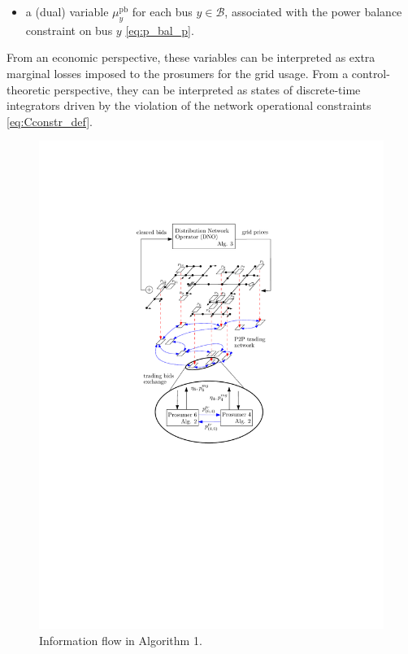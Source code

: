 \documentclass{IEEEtran}  %
\newcommand{\mc}{\mathcal}
\newcommand{\0}{\mathbf{0}}
\newcommand{\1}{\mathbf{1}}
\begin{document}
{\begin{itemize}
\item a (dual) variable $\mu_{y}^{\text{pb}}$ for each bus $y \in \mc B$, associated with the power balance constraint on bus $y$ \eqref{eq:p_bal_p}.
\end{itemize}
From an economic perspective, these variables can be interpreted as extra marginal losses imposed to the prosumers for the grid usage. From a control-theoretic perspective, they can be interpreted as states of discrete-time integrators driven by the violation of the network operational constraints \eqref{eq:Cconstr_def}.
}
%
\begin{figure}[t]
\centering
\includegraphics[width=.28\textwidth]{figures/37bus_sys_f6}
\smallskip
\caption{{Information flow in Algorithm 1.}}
\label{fig:IFC}
\end{figure}%
%
\end{document}
